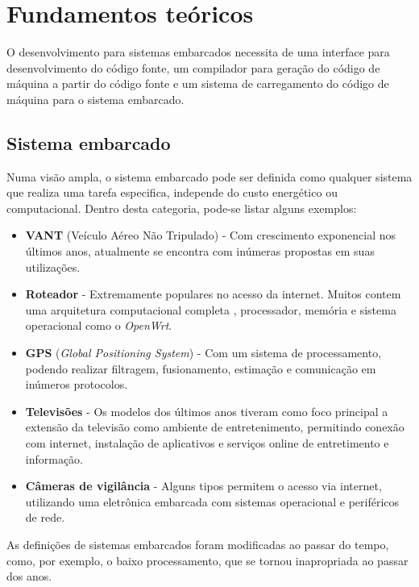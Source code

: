 \chapter{Fundamentos teóricos}

O desenvolvimento para sistemas embarcados necessita de uma interface para desenvolvimento do código fonte, um compilador para geração do código de máquina a partir do código fonte e um sistema de carregamento do código de máquina para o sistema embarcado.

\section{Sistema embarcado}

Numa visão ampla, o sistema embarcado pode ser definida como qualquer sistema que realiza uma tarefa especifica, independe do custo energético ou computacional\cite{barr2006programming}. Dentro desta categoria, pode-se listar alguns exemplos:

\begin{itemize}
\item \textbf{VANT} (Veículo Aéreo Não Tripulado) - Com crescimento exponencial nos últimos anos, atualmente se encontra com inúmeras propostas em suas utilizações.
\item \textbf{Roteador} - Extremamente populares no acesso da internet. Muitos contem uma arquitetura computacional completa , processador, memória e sistema operacional como o \textit{OpenWrt}\cite{openwrt}.
\item \textbf{GPS} (\textit{Global Positioning System}) - Com um sistema de processamento, podendo realizar filtragem, fusionamento, estimação e comunicação em inúmeros protocolos.
\item \textbf{Televisões} - Os modelos dos últimos anos tiveram como foco principal a extensão da televisão como ambiente de entretenimento, permitindo conexão com internet, instalação de aplicativos e serviços online de entretimento e informação.
\item \textbf{Câmeras de vigilância} - Alguns tipos permitem o acesso via internet, utilizando uma eletrônica embarcada com sistemas operacional e periféricos de rede.
\end{itemize}


As definições de sistemas embarcados foram modificadas ao passar do tempo, como, por exemplo, o baixo processamento, que se tornou inapropriada ao passar dos anos\cite{aiimpacts}.

